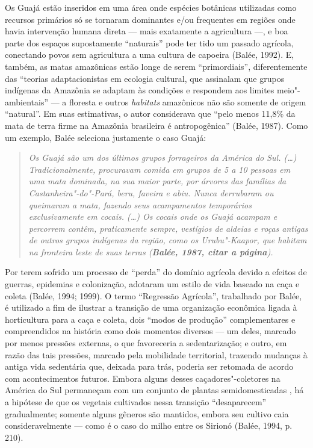 Os Guajá estão inseridos em uma área onde espécies botânicas utilizadas
como recursos primários só se tornaram dominantes e/ou frequentes em
regiões onde havia intervenção humana direta --- mais exatamente a
agricultura ---, e boa parte dos espaços supostamente ``naturais'' pode
ter tido um passado agrícola, conectando povos sem agricultura a uma
cultura de capoeira (Balée, 1992). E, também, as matas amazônicas estão
longe de serem ``primordiais'', diferentemente das ``teorias
adaptacionistas em ecologia cultural, que assinalam que grupos indígenas
da Amazônia se adaptam às condições e respondem aos limites
meio"-ambientais'' --- a floresta e outros \emph{habitats} amazônicos não
são somente de origem ``natural''. Em suas estimativas, o autor
considerava que ``pelo menos 11,8\% da mata de terra firme na Amazônia
brasileira é antropogênica'' (Balée, 1987). Como um exemplo, Balée
seleciona justamente o caso Guajá:

\begin{quote}
\emph{Os Guajá são um dos últimos grupos forrageiros da América do Sul.
(\ldots{}) Tradicionalmente, procuravam comida em grupos de 5 a 10
pessoas em uma mata dominada, na sua maior parte, por árvores das
famílias da Castanheira"-do"-Pará, beru, faveira e abiu. Nunca derrubaram
ou queimaram a mata, fazendo seus acampamentos temporários
exclusivamente em cocais. (\ldots{}) Os cocais onde os Guajá acampam e
percorrem contêm, praticamente sempre, vestígios de aldeias e roças
antigas de outros grupos indígenas da região, como os Urubu"-Kaapor, que
habitam na fronteira leste de suas terras (\textbf{Balée, 1987, citar a
página}).}
\end{quote}

Por terem sofrido um processo de ``perda'' do domínio agrícola devido a
efeitos de guerras, epidemias e colonização, adotaram um estilo de vida
baseado na caça e coleta (Balée, 1994; 1999). O termo ``Regressão
Agrícola'', trabalhado por Balée, é utilizado a fim de ilustrar a
transição de uma organização econômica ligada à horticultura para a caça
e coleta, dois ``modos de produção'' complementares e compreendidos na
história como dois momentos diversos --- um deles, marcado por menos
pressões externas, o que favoreceria a sedentarização; e outro, em razão
das tais pressões, marcado pela mobilidade territorial, trazendo
mudanças à antiga vida sedentária que, deixada para trás, poderia ser
retomada de acordo com acontecimentos futuros. Embora alguns desses
caçadores"-coletores na América do Sul permaneçam com um conjunto de
plantas semidomesticadas , há a hipótese de que os vegetais cultivados
nessa transição ``desaparecem'' gradualmente; somente alguns gêneros são
mantidos, embora seu cultivo caia consideravelmente --- como é o caso do
milho entre os Sirionó (Balée, 1994, p. 210).


